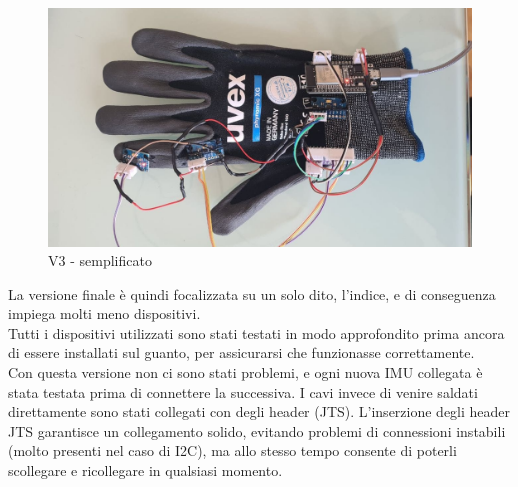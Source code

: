 \begin{figure}[H]
    \includegraphics[scale=0.35]{immagini/prototipo3.jpg}
    \centering
    \caption{V3 - semplificato}
\end{figure}

La versione finale è quindi focalizzata su un solo dito, l'indice, e di conseguenza impiega molti meno dispositivi.\\

Tutti i dispositivi utilizzati sono stati testati in modo approfondito prima ancora di essere installati sul guanto, per assicurarsi che funzionasse correttamente.\\

Con questa versione non ci sono stati problemi, e ogni nuova IMU collegata è stata testata prima di connettere la successiva. I cavi invece di venire saldati direttamente sono stati collegati con degli header (JTS).
L'inserzione degli header JTS garantisce un collegamento solido, evitando problemi di connessioni instabili (molto presenti nel caso di I2C), ma allo stesso tempo consente di poterli scollegare e ricollegare in qualsiasi momento.\\

\clearpage